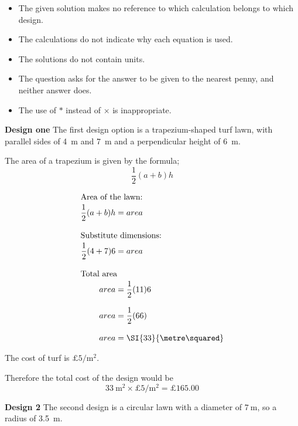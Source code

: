 \documentclass[a4paper]{tufte-handout}
\begin{document}
\begin{question}

\qpart
\begin{itemize}
\item The given solution makes no reference to which calculation belongs to which design. 
\item The calculations do not indicate why each equation is used.
\item The solutions do not contain units.
\item The question asks for the answer to be given to the nearest penny, and neither answer does.
\item The use of $*$ instead of $\times$ is inappropriate.  
\end{itemize}

\vspace{2cm}

\qpart
\textbf{Design one}
The first design option is a trapezium-shaped turf lawn, with parallel sides of \SI{4}{\metre} and \SI{7}{\meter} and a perpendicular height of \SI{6}{\metre}.


The area of a trapezium is given by the formula; \[\frac{1}{2}(a+b)h\]

\begin{align*}
\shortintertext{Area of the lawn: }
\frac{1}{2}(a+b)h&=area\\[8pt]
\shortintertext{Substitute dimensions: }
\frac{1}{2}(4+7)6&=area\\[8pt]
\shortintertext{Total area}
area &=\frac{1}{2}(11)6\\[8pt]
area &=\frac{1}{2}(66)\\[8pt]
area &= \SI{33}{\metre\squared}\\
\end{align*}
 
 \pagebreak
 
The cost of turf is $\pounds5\unit{\per\metre\squared}$.

Therefore the total cost of the design would be \[\SI{33}{\metre\squared} \times \pounds5\unit{\per\metre\squared}=\pounds165.00\] 

\textbf{Design 2}
The second design is a circular lawn with a diameter of $\SI{7}{\metre}$, so a radius of \SI{3.5}{\metre}.


\end{question}
\end{document}

